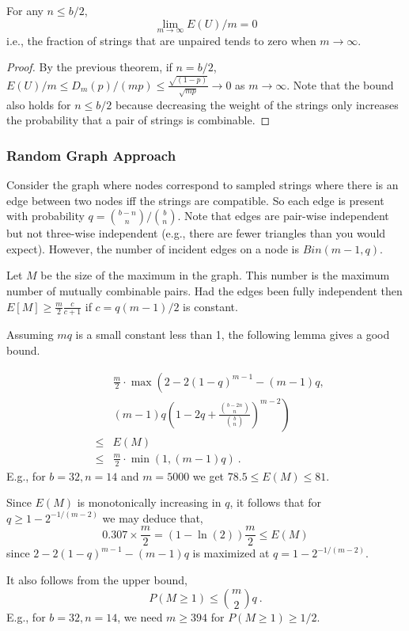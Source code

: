\begin{corollary}
For any $n\leq b/2$, \[\lim_{m\rightarrow \infty} E(U)/m=0\] i.e.,  the fraction of strings that are unpaired tends to zero when $m\rightarrow \infty$.
\end{corollary}
\begin{proof}
By the previous theorem, if $n=b/2$, $E(U)/m \leq D_m(p)/(mp)\leq \frac{\sqrt{(1-p)}}{\sqrt{mp}} \rightarrow 0$ as $m\rightarrow \infty$. Note that the bound also holds for $n\leq b/2$ because decreasing the weight of the strings only increases the probability that a pair of strings is combinable.
\end{proof}

\subsubsection{Random Graph Approach}
Consider the graph where nodes correspond to sampled strings where there
is an edge between two nodes iff the strings are compatible. So each
edge is present with probability $q={b-n \choose n}/{b\choose
  n}$. Note that edges are pair-wise independent but not three-wise
independent (e.g., there are fewer triangles than you would
expect). However, the number of incident edges on a node is
$Bin(m-1,q)$.

Let $M$ be the size of the maximum in the graph. This number is the maximum
number of mutually combinable pairs. Had the edges been fully
independent then $E[M]\geq \frac{m}{2}\frac{c}{c+1}$ if $c=q(m-1)/2$
is constant.

Assuming $mq$ is a small constant less than 1, the following lemma gives a good bound.
\begin{lemma}
\begin{eqnarray*}
& & \frac{m}{2} \cdot  \max \left (2-2(1-q)^{m-1}-(m-1) q, \right . \\
& & \left . (m-1) q\left (1-2q+\frac{{b-2n \choose n}}{{b \choose n}}\right )^{m-2}\right ) \\
&\leq & E(M) \\
& \leq & \frac{m}{2} \cdot  \min(1,(m-1)q) \ .
\end{eqnarray*} 
E.g., for $b=32, n=14$ and $m=5000$ we get $78.5 \leq E(M)\leq 81$. 

Since $E(M)$ is monotonically increasing in $q$, it follows that for $q\geq 1-2^{-1/(m-2)}$ we may deduce that, 
\[0.307 \times \frac{m}{2}=(1-\ln(2))\frac{m}{2} \leq E(M)\]
since $2-2(1-q)^{m-1}-(m-1) q$ is maximized at $q=1-2^{-1/(m-2)}$.
%

It also follows from the upper bound,
\[P(M\geq 1)\leq {m \choose 2} q \ .\]
E.g., for $b=32, n=14$, we need $m\geq 394$ for $P(M\geq 1)\geq 1/2$.
\end{lemma}

